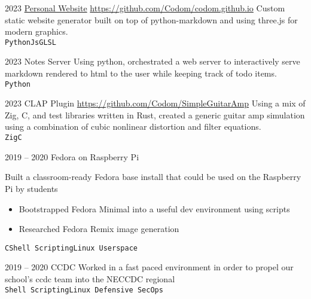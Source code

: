 \documentclass[9pt]{developercv} %
\begin{document}

\begin{entrylist}
	\entry
	{2023}
	{\href{https://chrisodom.org/}{Personal Website}}
    {\href{https://github.com/Codom/codom.github.io}{https://github.com/Codom/codom.github.io}}
    {
        Custom static website generator built on top of python-markdown and using three.js for modern
	    graphics.
	    \\
	    \texttt{Python}\slashsep\texttt{Js}\slashsep\texttt{GLSL}
    }

	\entry
	{2023}
	{Notes Server}
    {}
    {
        Using python, orchestrated a web server to interactively serve markdown rendered to
        html to the user while keeping track of todo items.
	    \\
	    \texttt{Python}
    }

	\entry
	{2023}
    {CLAP Plugin}
    {\href{https://github.com/Codom/SimpleGuitarAmp}{https://github.com/Codom/SimpleGuitarAmp}}
    {
        Using a mix of Zig, C, and test libraries written in Rust, created a generic guitar
        amp simulation using a combination of cubic nonlinear distortion and filter equations.
        \\
        \texttt{Zig}\slashsep\texttt{C}
    }

\end{entrylist}


\begin{entrylist}
	\entry
		{2019 -- 2020}
		{Fedora on Raspberry Pi}
        {}
        {
	Built a classroom-ready Fedora base install that could be used on the Raspberry Pi by students
	\begin{itemize}\itemsep=0em
		\item Bootstrapped Fedora Minimal into a useful dev environment using scripts
		\item Researched Fedora Remix image generation
	\end{itemize}
	\texttt{C}\slashsep\texttt{Shell Scripting}\slashsep\texttt{Linux Userspace}}
	\entry
		{2019 -- 2020}
		{CCDC}
        {}
        {Worked in a fast paced environment in order to propel our school's ccdc team into
	the NECCDC regional\\
        \texttt{Shell Scripting}\slashsep\texttt{Linux Defensive SecOps}}
\end{entrylist}

\end{document}
